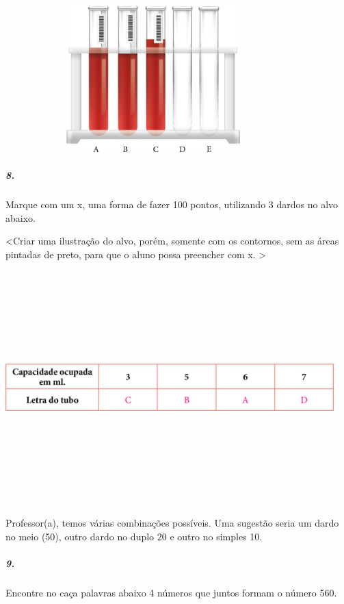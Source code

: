 \includegraphics[width=4.50000in,height=2.22917in]{media/image36.png}

\subparagraph{8.}\label{section-21}

Marque com um x, uma forma de fazer 100 pontos, utilizando 3 dardos no
alvo abaixo.

\textless{}Criar uma ilustração do alvo, porém, somente com os
contornos, sem as áreas pintadas de preto, para que o aluno possa
preencher com x. \textgreater{}

\includegraphics[width=5.00000in,height=3.54167in]{media/image37.png}

Professor(a), temos várias combinações possíveis. Uma sugestão seria um
dardo no meio (50), outro dardo no duplo 20 e outro no simples 10.

\subparagraph{9.}\label{section-22}

Encontre no caça palavras abaixo 4 números que juntos formam o número
560.

